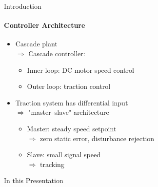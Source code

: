 \begin{frame}{Introduction}
  \framesubtitle{Controller Architecture}
  \begin{itemize}
    \item Cascade plant \\$\Rightarrow$ Cascade controller:
    \begin{itemize}
      \item Inner loop: DC motor speed control
      \item Outer loop: traction control
    \end{itemize}
    \item Traction system has differential input \\$\Rightarrow$ "master--slave" architecture
    \begin{itemize}
    \item Master: steady speed setpoint \\$\Rightarrow$ zero static error, disturbance rejection
    \item Slave: small signal speed \\$\Rightarrow$ tracking
    \end{itemize}
  \end{itemize}
\end{frame}

\begin{frame}{In this Presentation}
\tableofcontents
\end{frame}
